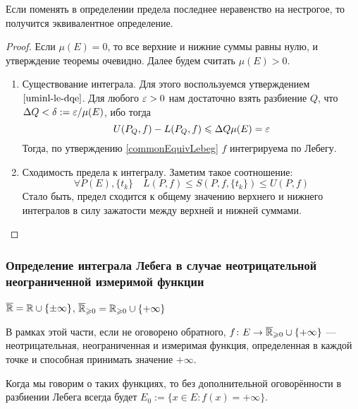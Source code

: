 \begin{reminder}
	Если поменять в определении предела последнее неравенство на нестрогое, то получится эквивалентное определение.
\end{reminder}

\begin{proof}
	Если $\mu(E) = 0$, то все верхние и нижние суммы равны нулю, и утверждение теоремы очевидно. Далее будем считать $\mu(E) > 0$.
	\begin{enumerate}
		\item Существование интеграла. Для этого воспользуемся утверждением $\ref{uminl-le-dqe}$. Для любого $\varepsilon > 0$ нам достаточно взять разбиение $Q$, что $\Delta Q < \delta := \varepsilon / \mu(E)$, ибо тогда
		\[
			U(P_Q, f) - L(P_Q, f) \leqslant \Delta Q \mu(E) = \varepsilon
		\]
		Тогда, по утверждению \ref{commonEquivLebeg} $f$ интегрируема по Лебегу.
		
		\item Сходимость предела к интегралу. Заметим такое соотношение:
		\[
			\forall P(E), \{t_k\} \quad L(P, f) \le S(P, f, \{t_k\}) \le U(P, f)
		\]
		Стало быть, предел сходится к общему значению верхнего и нижнего интегралов в силу зажатости между верхней и нижней суммами.
	\end{enumerate}
\end{proof}

\subsubsection*{Определение интеграла Лебега в случае неотрицательной неограниченной измеримой функции}

\begin{designation}
	$\overline{\mathbb{R}} = \mathbb{R} \cup \{\pm\infty\}$, $\overline{\mathbb{R}}_{\geqslant 0} = \mathbb{R}_{\geqslant 0} \cup \{+\infty\}$
\end{designation}

\begin{note}
	В рамках этой части, если не оговорено обратного, $f \colon E \to \overline{\mathbb{R}}_{\geqslant 0} \cup \{+\infty\}$ --- неотрицательная, неограниченная и измеримая функция, определенная в каждой точке и способная принимать значение $+\infty$.
\end{note}

\begin{designation}
	Когда мы говорим о таких функциях, то без дополнительной оговорённости в разбиении Лебега всегда будет $E_0 := \{x \in E \colon f(x) = +\infty\}$.
\end{designation}

